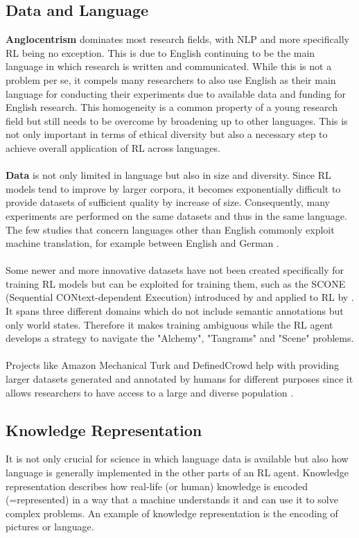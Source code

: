 \documentclass[11pt,a4paper]{article}
\begin{document}
\subsection{Data and Language}
\textbf{Anglocentrism} dominates most research fields, with NLP and more specifically RL being no exception. This is due to English continuing to be the main language in which research is written and communicated. While this is not a problem per se, it compels many researchers to also use English as their main language for conducting their experiments due to available data and funding for English research. This homogeneity is a common property of a young research field but still needs to be overcome by broadening up to other languages. This is not only important in terms of ethical diversity but also a necessary step to achieve overall application of RL across languages. \\\\
\textbf{Data} is not only limited in language but also in size and diversity. Since RL models tend to improve by larger corpora, it becomes exponentially difficult to provide datasets of sufficient quality by increase of size. Consequently, many experiments are performed on the same datasets and thus in the same language. The few studies that concern languages other than English commonly exploit machine translation, for example between English and German \citet{yasui-etal-2019}. \\\\
Some newer and more innovative datasets have not been created specifically for training RL models but can be exploited for training them, such as the SCONE (Sequential CONtext-dependent Execution) introduced by \citet{long-2016} and applied to RL by \cite{guu-etal-2017-language}. It spans three different domains which do not include semantic annotations but only world states. Therefore it makes training ambiguous while the RL agent develops a strategy to navigate the "Alchemy", "Tangrams" and "Scene" problems.\\\\
Projects like Amazon Mechanical Turk and DefinedCrowd help with providing larger datasets generated and annotated by humans  for different purposes since it allows researchers to have access to a large and diverse population \citep{AMTurk-2012,DefinedCrowd}. 

\subsection{Knowledge Representation}
It is not only crucial for science in which language data is available but also how language is generally implemented in the other parts of an RL agent. Knowledge representation describes how real-life (or human) knowledge is encoded (=represented) in a way that a machine understands it and can use it to solve complex problems. An example of knowledge representation is the encoding of pictures or language.
\par
\end{document}
